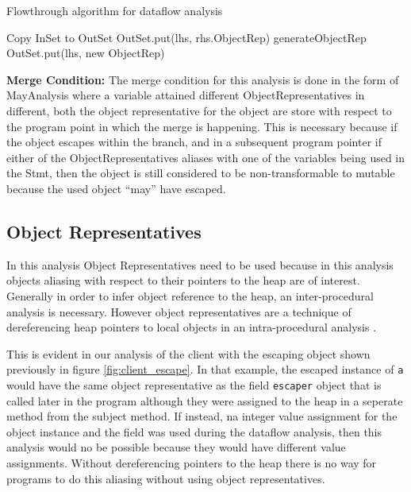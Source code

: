 \begin{algorithm}
\caption{Flowthrough algorithm for dataflow analysis}
\label{fig:flowthrough}
\begin{algorithmic}
  \State Copy InSet to OutSet\;
		\State OutSet.put(lhs, rhs.ObjectRep)\;
	\Else
		\State generateObjectRep\;
		\State OutSet.put(lhs, new ObjectRep)\;
	\EndIf	

  \EndIf
\end{algorithmic}
\end{algorithm}
\textbf{Merge Condition: } The merge condition for this analysis is done in the form of MayAnalysis where a variable attained different ObjectRepresentatives in different, both the object representative for the object are store with respect to the program point in which the merge is happening. This is necessary because if the object escapes within the branch, and in a subsequent program pointer if either of the ObjectRepresentatives aliases with one of the variables being used in the Stmt, then the object is still considered to be non-transformable to mutable because the used object ``may'' have escaped.

\subsection{Object Representatives}\label{sec:OR}
In this analysis Object Representatives need to be used because in this analysis objects aliasing with respect to their pointers to the heap are of interest. Generally in order to infer object reference to the heap, an inter-procedural analysis is necessary. However object representatives are a technique of dereferencing heap pointers to local objects in an intra-procedural analysis \cite{ref:or}.

This is evident in our analysis of the client with the escaping object shown previously in figure \ref{fig:client_escape}. In that example, the escaped instance of \texttt{a} would have the same object representative as the field \texttt{escaper} object that is called later in the program although they were assigned to the heap in a seperate method from the subject method. If instead, na integer value assignment for the object instance and the field was used during the dataflow analysis, then this analysis would no be possible because they would have different value assignments. Without dereferencing pointers to the heap there is no way for programs to do this aliasing without using object representatives.

